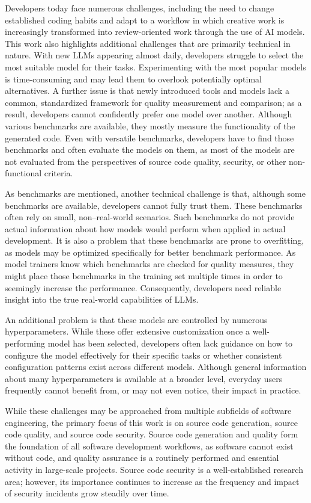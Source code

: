 \documentclass[12pt,a4paper]{extarticle}
\begin{document}
Developers today face numerous challenges, including the need to change established coding habits and adapt to a workflow in which creative work is increasingly transformed into review-oriented work through the use of AI models.
This work also highlights additional challenges that are primarily technical in nature.
With new LLMs appearing almost daily, developers struggle to select the most suitable model for their tasks.
Experimenting with the most popular models is time-consuming and may lead them to overlook potentially optimal alternatives.
A further issue is that newly introduced tools and models lack a common, standardized framework for quality measurement and comparison; as a result, developers cannot confidently prefer one model over another.
Although various benchmarks are available, they mostly measure the functionality of the generated code.
Even with versatile benchmarks, developers have to find those benchmarks and often evaluate the models on them, as most of the models are not evaluated from the perspectives of source code quality, security, or other non-functional criteria.

As benchmarks are mentioned, another technical challenge is that, although some benchmarks are available, developers cannot fully trust them.
These benchmarks often rely on small, non–real-world scenarios.
Such benchmarks do not provide actual information about how models would perform when applied in actual development.
It is also a problem that these benchmarks are prone to overfitting, as models may be optimized specifically for better benchmark performance.
As model trainers know which benchmarks are checked for quality measures, they might place those benchmarks in the training set multiple times in order to seemingly increase the performance.
Consequently, developers need reliable insight into the true real-world capabilities of LLMs.

An additional problem is that these models are controlled by numerous hyperparameters.
While these offer extensive customization once a well-performing model has been selected, developers often lack guidance on how to configure the model effectively for their specific tasks or whether consistent configuration patterns exist across different models.
Although general information about many hyperparameters is available at a broader level, everyday users frequently cannot benefit from, or may not even notice, their impact in practice.

While these challenges may be approached from multiple subfields of software engineering, the primary focus of this work is on source code generation, source code quality, and source code security.
Source code generation and quality form the foundation of all software development workflows, as software cannot exist without code, and quality assurance is a routinely performed and essential activity in large-scale projects.
Source code security is a well-established research area; however, its importance continues to increase as the frequency and impact of security incidents grow steadily over time.
\end{document}
